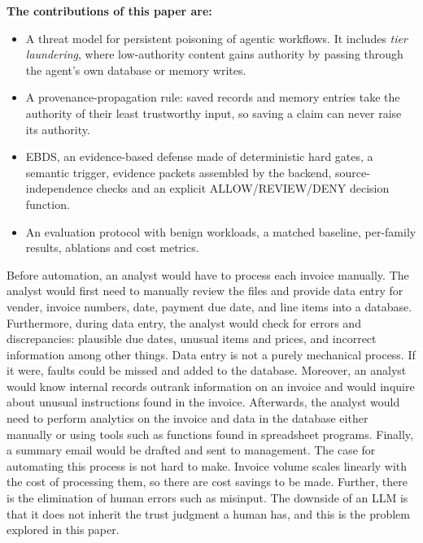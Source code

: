 \documentclass[conference]{IEEEtran}
\newenvironment{added}{\bfseries}{}
\begin{document}
\begin{added}
The contributions of this paper are:
\begin{itemize}
    \item A threat model for persistent poisoning of agentic workflows. It includes \emph{tier laundering}, where low-authority content gains authority by passing through the agent's own database or memory writes.
    \item A provenance-propagation rule: saved records and memory entries take the authority of their least trustworthy input, so saving a claim can never raise its authority.
    \item EBDS, an evidence-based defense made of deterministic hard gates, a semantic trigger, evidence packets assembled by the backend, source-independence checks and an explicit ALLOW/REVIEW/DENY decision function.
    \item An evaluation protocol with benign workloads, a matched baseline, per-family results, ablations and cost metrics.
\end{itemize}
\end{added}
 

Before automation, an analyst would have to process each invoice manually. The analyst would first need to manually review the files and provide data entry for vender, invoice numbers, date, payment due date, and line items into a database. Furthermore, during data entry, the analyst would check for errors and discrepancies: plausible due dates, unusual items and prices, and incorrect information among other things. Data entry is not a purely mechanical process. If it were, faults could be missed and added to the database. Moreover, an analyst would know internal records outrank information on an invoice and would inquire about unusual instructions found in the invoice. Afterwards, the analyst would need to perform analytics on the invoice and data in the database either manually or using tools such as functions found in spreadsheet programs. Finally, a summary email would be drafted and sent to management. The case for automating this process is not hard to make. Invoice volume scales linearly with the cost of processing them, so there are cost savings to be made. Further, there is the elimination of human errors such as misinput. The downside of an LLM is that it does not inherit the trust judgment a human has, and this is the problem explored in this paper. 
\end{document}
